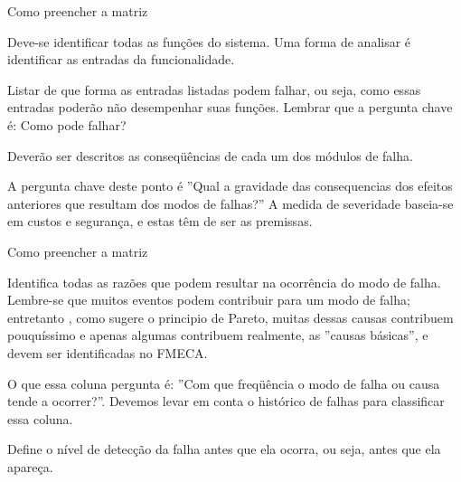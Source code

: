 \documentclass[aspectratio=169]{beamer}
\begin{document}
\begin{frame}[t]{Como preencher a matriz}
    \begin{description}[rightmargin=2em,style=nextline]
        \item [Função:] Deve-se identificar todas as funções do sistema. Uma forma de analisar é identificar as entradas da funcionalidade.
        \item [Modos de falhas em potencial:] Listar de que forma as entradas listadas podem falhar, ou seja, como essas entradas poderão não desempenhar suas funções. Lembrar que a pergunta chave é: Como pode falhar?
        \item [Efeitos potenciais da falha:] Deverão ser descritos as conseqüências de cada um dos módulos de falha. 
        \item [Severidade:] A pergunta chave deste ponto é ”Qual a gravidade das consequencias dos efeitos anteriores que resultam dos modos de falhas?” A medida de severidade baseia-se em custos e segurança, e estas têm de ser as premissas.
    \end{description}
\end{frame}
\begin{frame}[t]{Como preencher a matriz}
    \begin{description}[rightmargin=2em,style=nextline]
        \item [Causas potenciais de falhas:] Identifica todas as razões que podem resultar na ocorrência do modo de falha. Lembre-se que muitos eventos podem contribuir para um modo de falha; entretanto , como sugere o principio de Pareto, muitas dessas causas contribuem pouquíssimo e apenas algumas contribuem realmente, as ”causas básicas”, e devem ser identificadas no FMECA.
        \item [Ocorrência:] O que essa coluna pergunta é: ”Com que freqüência o modo de falha ou causa tende a ocorrer?”. Devemos levar em conta o histórico de falhas para classificar essa coluna.
        \item [Detecção:] Define o nível de detecção da falha antes que ela ocorra, ou seja, antes que ela apareça.
    \end{description}
\end{frame}
\end{document}
